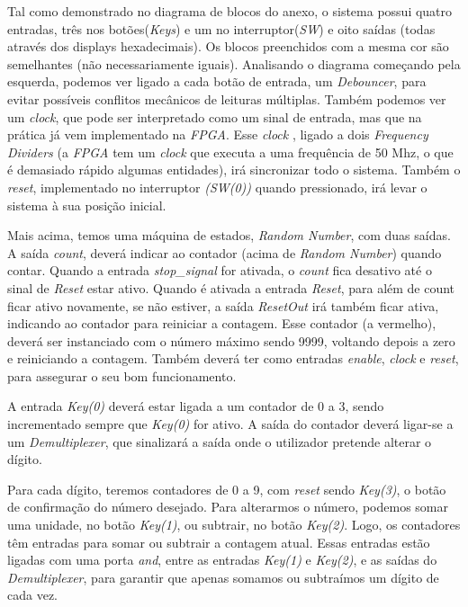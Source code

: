\documentclass[11pt,openany,twoside]{report}
\begin{document}
Tal como demonstrado no diagrama de blocos do anexo, o sistema possui quatro entradas, três nos botões(\textit{Keys}) e um no interruptor(\textit{SW}) e oito saídas (todas através dos displays hexadecimais). Os blocos preenchidos com a mesma cor são semelhantes (não necessariamente iguais). Analisando o diagrama começando pela esquerda, podemos ver ligado a cada botão de entrada, um \textit{Debouncer}, para evitar possíveis conflitos mecânicos de leituras múltiplas. Também podemos ver um \textit{clock}, que pode ser interpretado como um sinal de entrada, mas que na prática já vem implementado na \textit{FPGA}. Esse \textit{clock} , ligado a dois \textit{Frequency Dividers} (a \textit{FPGA} tem um \textit{clock} que executa a uma frequência de 50 Mhz, o que é demasiado rápido algumas entidades), irá sincronizar todo o sistema. Também o \textit{reset}, implementado no interruptor \textit{(SW(0))} quando pressionado, irá levar o sistema à sua posição inicial.

Mais acima, temos uma máquina de estados, \textit{Random Number}, com duas saídas. A saída \textit{count}, deverá indicar ao contador (acima de \textit{Random Number}) quando contar. Quando a entrada \textit{stop\_signal} for ativada, o \textit{count} fica desativo até o sinal de \textit{Reset} estar ativo. Quando é ativada a entrada \textit{Reset}, para além de count ficar ativo novamente, se não estiver, a saída \textit{ResetOut} irá também ficar ativa, indicando ao contador para reiniciar a contagem. Esse contador (a vermelho), deverá ser instanciado com o número máximo sendo 9999, voltando depois a zero e reiniciando a contagem. Também deverá ter como entradas \textit{enable}, \textit{clock} e \textit{reset}, para assegurar o seu bom funcionamento.

A entrada \textit{Key(0)} deverá estar ligada a um contador de 0 a 3, sendo incrementado sempre que \textit{Key(0)} for ativo. A saída do contador deverá ligar-se a um \textit{Demultiplexer}, que sinalizará a saída onde o utilizador pretende alterar o dígito. 

Para cada dígito, teremos contadores de 0 a 9, com \textit{reset} sendo \textit{Key(3)}, o botão de confirmação do número desejado. Para alterarmos o número, podemos somar uma unidade, no botão \textit{Key(1)}, ou subtrair, no botão \textit{Key(2)}. Logo, os contadores têm entradas para somar ou subtrair a contagem atual. Essas entradas estão ligadas com uma porta \textit{and}, entre as entradas \textit{Key(1)} e \textit{Key(2)}, e as saídas do \textit{Demultiplexer}, para garantir que apenas somamos ou subtraímos um dígito de cada vez.
\end{document}

